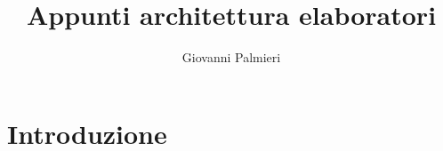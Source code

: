 \documentclass[a4paper,12pt]{article}
\title{Appunti architettura elaboratori}
\author{Giovanni Palmieri}
\begin{document}
\maketitle

\tableofcontents

\section{Introduzione}


\end{document}
